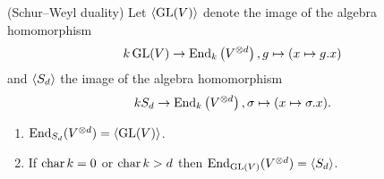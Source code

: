 \begin{thrm}(Schur--Weyl duality)
  Let $\left\langle \operatorname{GL}(V) \right\rangle$ denote the image of the algebra homomorphism
  \[
            k \operatorname{GL}(V)
    \to     \operatorname{End}_k\left( V^{\otimes d} \right),
            g
    \mapsto (x \mapsto g.x)
  \]
  and $\left\langle S_d \right\rangle$ the image of the algebra homomorphism
  \[
            k S_d
    \to     \operatorname{End}_k\left( V^{\otimes d} \right),
            \sigma
    \mapsto (x \mapsto \sigma.x).
  \]
  \begin{enumerate}[label=\emph{(\alph*)}, leftmargin=*]
    \item \label{enum: end sd = gl}
      $\operatorname{End}_{S_d}(V^{\otimes d}) = \left\langle \operatorname{GL}(V) \right\rangle$.
    \item \label{enum: end gl = sd}
      If $\operatorname{char} k = 0$ or $\operatorname{char} k > d$ then $\operatorname{End}_{\operatorname{GL}(V)}(V^{\otimes d}) = \left\langle S_d \right\rangle$.
  \end{enumerate}
\end{thrm}
